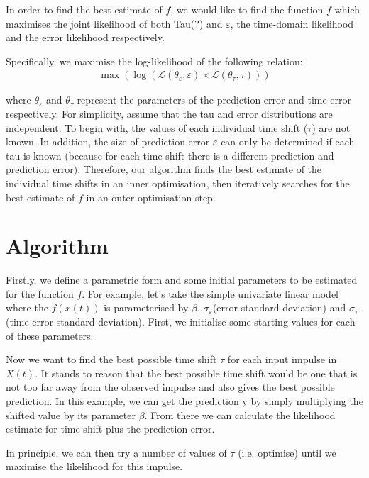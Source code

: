 \documentclass[11pt]{amsart}
\begin{document}
In order to find the best estimate of $f$, we would like to find the function $f$ which maximises the joint likelihood of both Tau(?) and $\varepsilon$, the time-domain likelihood and the error likelihood respectively.

Specifically, we maximise the log-likelihood of the following relation:
\begin{align}
\max  \left( \log \left(\mathcal{L}(\theta_{\varepsilon}, \varepsilon) \times \mathcal{L}(\theta_{\tau}, \tau)\right) \right)
\end{align}

where $\theta_{\varepsilon}$ and $\theta_{\tau}$ represent the parameters of the prediction error and time error respectively. For simplicity, assume that the tau and error distributions are independent. To begin with, the values of each individual time shift ($\tau$) are not known. In addition, the size of prediction error $\varepsilon$ can only be determined if each tau is known (because for each time shift there is a different prediction and prediction error). Therefore, our algorithm finds the best estimate of the individual time shifts in an inner optimisation, then iteratively searches for the best estimate of $f$ in an outer optimisation step. 

\section{Algorithm}

Firstly, we define a parametric form and some initial parameters to be estimated for the function $f$. For example, let's take the simple univariate linear model where the $f(x(t))$ is parameterised by $\beta$, $\sigma_{\varepsilon}$(error standard deviation)  and $\sigma_{\tau}$ (time error standard deviation). First, we initialise some starting values for each of these parameters.

Now we want to find the best possible time shift $\tau$ for each input impulse in $X(t)$. It stands to reason that the best possible time shift would be one that is not too far away from the observed impulse and also gives the best possible prediction. In this example, we can get the prediction y by simply multiplying the shifted value by its parameter $\beta$. From there we can calculate the likelihood estimate for time shift plus the prediction error.

In principle, we can then try a number of values of $\tau$ (i.e. optimise) until we maximise the likelihood for this impulse.
\end{document}
